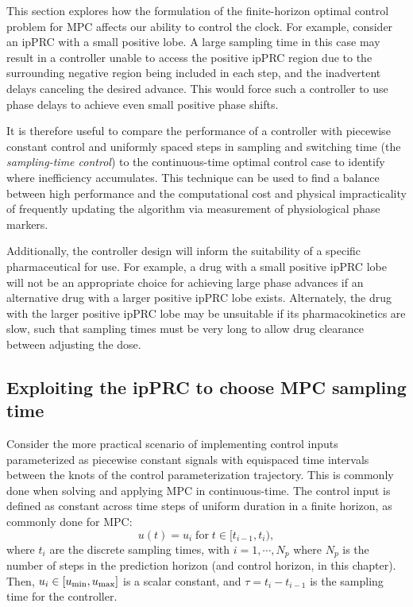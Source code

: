 This section explores how the formulation of the finite-horizon optimal control problem for MPC affects our ability to control the clock.
For example, consider an ipPRC with a small positive lobe.
A large sampling time in this case may result in a controller unable to access the positive ipPRC region due to the surrounding negative region being included in each step, and the inadvertent delays canceling the desired advance.
This would force such a controller to use phase delays to achieve even small positive phase shifts.

It is therefore useful to compare the performance of a controller with piecewise constant control and uniformly spaced steps in sampling and switching time (the \textit{sampling-time control}) to the continuous-time optimal control case to identify where inefficiency accumulates.
This technique can be used to find a balance between high performance and the computational cost and physical impracticality of frequently updating the algorithm via measurement of physiological phase markers.

Additionally, the controller design will inform the suitability of a specific pharmaceutical for use.
For example, a drug with a small positive ipPRC lobe will not be an appropriate choice for achieving large phase advances if an alternative drug with a larger positive ipPRC lobe exists.
Alternately, the drug with the larger positive ipPRC lobe may be unsuitable if its pharmacokinetics are slow, such that sampling times must be very long to allow drug clearance between adjusting the dose.

\subsection*{Exploiting the ipPRC to choose MPC sampling time}


Consider the more practical scenario of implementing control inputs parameterized as piecewise constant signals with equispaced time intervals between the knots of the control parameterization trajectory.
This is commonly done when solving and applying MPC in continuous-time.
The control input is defined as constant across time steps of uniform duration in a finite horizon, as commonly done for MPC:
\begin{equation}\label{eq:sampled_control_law}
    u(t) = u_i \; \mathrm{for} \; t\in[t_{i-1},t_{i}),
\end{equation}
where $t_i$ are the discrete sampling times, with $i=1,\cdots, N_p$ where $N_p$ is the number of steps in the prediction horizon (and control horizon, in this chapter).
Then, $u_i\in[u_{\rm min},u_{\rm max}]$ is a scalar constant, and $\tau = t_{i}-t_{i-1}$ is the sampling time for the controller.


